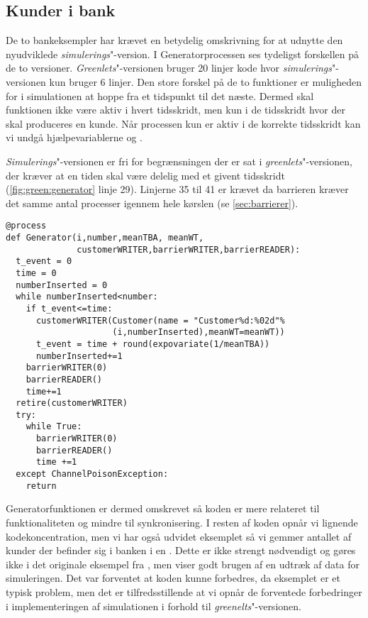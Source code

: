 \subsection{Kunder i bank}
De to bankeksempler har krævet en betydelig omskrivning for at udnytte den nyudviklede \emph{simulerings}"-version. I Generatorprocessen ses tydeligst forskellen på de to versioner. \emph{Greenlets}"-versionen bruger 20 linjer kode hvor \emph{simulerings}"-versionen kun bruger 6 linjer. Den store forskel på de to funktioner er muligheden for i simulationen  at hoppe fra et tidspunkt til det næste. Dermed skal funktionen ikke være aktiv i hvert tidsskridt, men kun i de tidsskridt hvor der skal produceres en kunde. Når processen kun er aktiv i de korrekte tidsskridt kan vi undgå hjælpevariablerne  og . 

\emph{Simulerings}"-versionen er fri for begrænsningen der er sat i \emph{greenlets}"-versionen, der kræver at en tiden skal være delelig med et givent tidsskridt (\cref{fig:green:generator} linje 29). Linjerne 35 til 41 er krævet da barrieren kræver det samme antal processer igennem hele kørslen (se \cref{sec:barrierer}). 

\begin{lstlisting}[firstnumber=21, label=fig:green:generator, caption=Generatorprocessen for Greenlets versionen]
@process
def Generator(i,number,meanTBA, meanWT,
              customerWRITER,barrierWRITER,barrierREADER):
  t_event = 0
  time = 0
  numberInserted = 0
  while numberInserted<number:
    if t_event<=time:
      customerWRITER(Customer(name = "Customer%d:%02d"%
                     (i,numberInserted),meanWT=meanWT))
      t_event = time + round(expovariate(1/meanTBA))
      numberInserted+=1
    barrierWRITER(0)
    barrierREADER()
    time+=1
  retire(customerWRITER)
  try:
    while True:
      barrierWRITER(0)
      barrierREADER()
      time +=1
  except ChannelPoisonException: 
    return
\end{lstlisting}

Generatorfunktionen er dermed omskrevet så koden er mere relateret til funktionaliteten og mindre til synkronisering.  I resten af koden opnår vi lignende kodekoncentration, men vi har også udvidet eksemplet så vi gemmer antallet af kunder der befinder sig i banken i en . Dette er ikke strengt nødvendigt og gøres ikke i det originale eksempel fra \simpy, men viser godt brugen af en  udtræk af data for simuleringen. Det var  forventet at koden kunne forbedres, da eksemplet er et typisk \des problem, men det er tilfredsstillende at vi opnår de forventede forbedringer i implementeringen af simulationen i forhold til \emph{greenelts}"-versionen.


